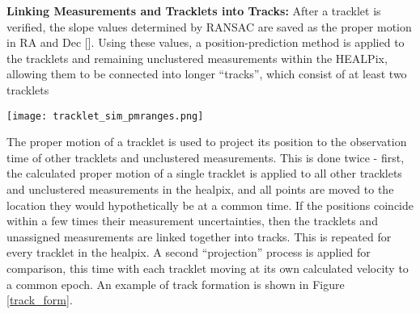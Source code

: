 \documentclass[twocolumn]{aastex62}
\begin{document}
{\bf Linking Measurements and Tracklets into Tracks:} After a tracklet is verified,
the slope values determined by RANSAC are saved as the proper motion in RA and Dec [\ded].  Using these values, a position-prediction method is applied to the tracklets and remaining unclustered measurements within the HEALPix, allowing them to be connected into longer ``tracks'', which consist of at least two tracklets    


\begin{figure*}[t]
\centering
\texttt{[image: tracklet\_sim\_pmranges.png]}
\caption{Density plots from the simulation showing 3 general ranges of tracklet proper motion $\mu$ [\arh]. CANFind results show the algorithm's upper \textit{(left)} and lower \textit{(center)} limits set by the parameters used for DBSCAN.  CANFind leaves a gap around $\mu$=0 of about 2.5\arh \editoneb{(0.017\ded)} in radius, which is filled in by the NSC object vetting process \textit{(right)} described in Sec \ref{ssec:nscobj} .}
\label{fig:simdiffs}
\end{figure*}


The proper motion of a tracklet is used to project its position to the observation time of other tracklets and unclustered measurements.  This is done twice - first, the calculated proper motion of a single tracklet is applied to all other tracklets and unclustered measurements in the healpix, and all points are moved to the location they would hypothetically be at a common time.  If the positions coincide within a few times their measurement uncertainties, then the tracklets and unassigned measurements are linked together into tracks.  This is repeated for every tracklet in the healpix.  A second ``projection'' process is applied for comparison, this time with each tracklet moving at its own calculated velocity to a common epoch.  An example of track formation is shown in Figure \ref{track_form}.
\end{document}
